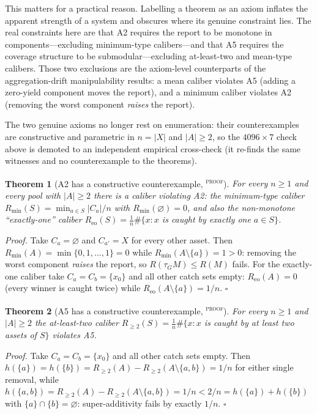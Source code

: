 \documentclass{article}
\newtheorem{theorem}{Theorem}
\newcommand{\evtag}[1]{\textsuperscript{\textsc{#1}}}
\begin{document}
This matters for a practical reason. Labelling a theorem as an axiom inflates the apparent strength of a
system and obscures where its genuine constraint lies. The real constraints here are that A2 requires the
report to be monotone in components---excluding minimum-type calibers---and that A5 requires the coverage
structure to be submodular---excluding at-least-two and mean-type calibers. Those two exclusions are the
axiom-level counterparts of the aggregation-drift manipulability results: a mean caliber violates A5
(adding a zero-yield component moves the report), and a minimum caliber violates A2 (removing the worst
component \emph{raises} the report).

The two genuine axioms no longer rest on enumeration: their counterexamples are constructive and
parametric in $n=|X|$ and $|A|\ge2$, so the $4096\times7$ check above is demoted to an independent
empirical cross-check (it re-finds the same witnesses and no counterexample to the theorems).

\begin{theorem}[A2 has a constructive counterexample, \evtag{proof}]
\label{thm:A2w}
For every $n\ge1$ and every pool with $|A|\ge2$ there is a caliber violating A2: the minimum-type
caliber $R_{\min}(S)=\min_{a\in S}|C_a|/n$ with $R_{\min}(\varnothing)=0$, and also the non-monotone
``exactly-one'' caliber $R_{\text{eo}}(S)=\frac1n\#\{x: x$ is caught by exactly one $a\in S\}$.
\end{theorem}

\noindent\emph{Proof.} Take $C_a=\varnothing$ and $C_{a'}=X$ for every other asset. Then
$R_{\min}(A)=\min\{0,1,\dots,1\}=0$ while $R_{\min}(A\setminus\{a\})=1>0$: removing the worst
component \emph{raises} the report, so $R(\tau_G M)\le R(M)$ fails. For the exactly-one caliber take
$C_a=C_b=\{x_0\}$ and all other catch sets empty: $R_{\text{eo}}(A)=0$ (every winner is caught twice)
while $R_{\text{eo}}(A\setminus\{a\})=1/n$. $\square$

\begin{theorem}[A5 has a constructive counterexample, \evtag{proof}]
\label{thm:A5w}
For every $n\ge1$ and $|A|\ge2$ the at-least-two caliber
$R_{\ge2}(S)=\frac1n\#\{x: x$ is caught by at least two assets of $S\}$ violates A5.
\end{theorem}

\noindent\emph{Proof.} Take $C_a=C_b=\{x_0\}$ and all other catch sets empty. Then
$h(\{a\})=h(\{b\})=R_{\ge2}(A)-R_{\ge2}(A\setminus\{a,b\})=1/n$ for either single removal, while
$h(\{a,b\})=R_{\ge2}(A)-R_{\ge2}(A\setminus\{a,b\})=1/n<2/n=h(\{a\})+h(\{b\})$ with
$\{a\}\cap\{b\}=\varnothing$: super-additivity fails by exactly $1/n$. $\square$
\end{document}
